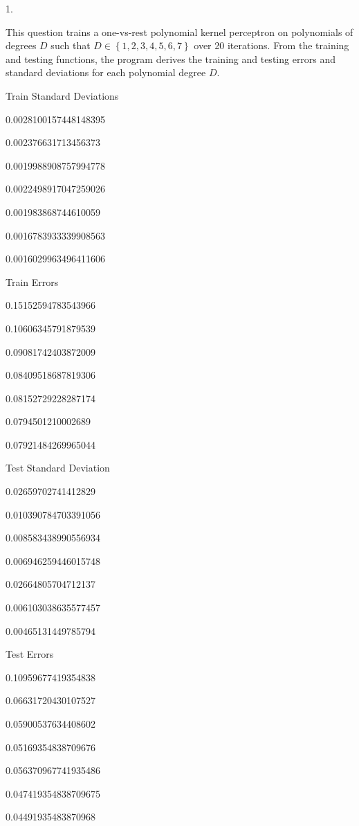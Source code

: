 \documentclass[
]{article}
\author{}
\date{}
\begin{document}
1.

This question trains a one-vs-rest polynomial kernel perceptron on
polynomials of degrees \(D\) such that
\(D \in \left\{ 1,2,3,4,5,6,7 \right\}\) over 20 iterations. From the
training and testing functions, the program derives the training and
testing errors and standard deviations for each polynomial degree \(D\).

Train Standard Deviations

0.0028100157448148395

0.002376631713456373

0.0019988908757994778

0.0022498917047259026

0.001983868744610059

0.0016783933339908563

0.0016029963496411606

Train Errors

0.15152594783543966

0.10606345791879539

0.09081742403872009

0.08409518687819306

0.08152729228287174

0.0794501210002689

0.07921484269965044

Test Standard Deviation

0.02659702741412829

0.010390784703391056

0.008583438990556934

0.006946259446015748

0.02664805704712137

0.006103038635577457

0.00465131449785794

Test Errors

0.10959677419354838

0.06631720430107527

0.05900537634408602

0.05169354838709676

0.056370967741935486

0.047419354838709675

0.04491935483870968
\end{document}
